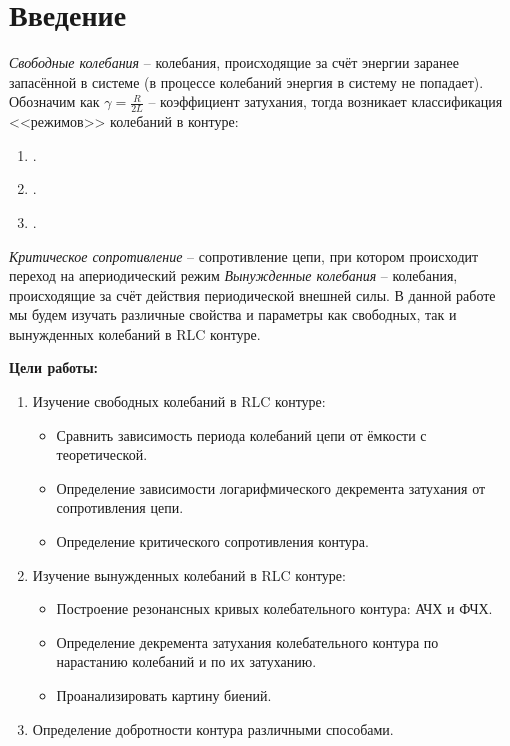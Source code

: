 \documentclass[a4paper,12pt]{extarticle}
\begin{document}
\setcounter{page}{2} %
\let \savenumberline \numberline
\def \numberline#1{\savenumberline{#1.}}
\tableofcontents
\bigskip

\newpage
\section{Введение}
\textit{Свободные колебания} -- колебания, происходящие за счёт энергии заранее запасённой в системе (в процессе колебаний энергия в систему не попадает). Обозначим как $\gamma = \frac{R}{2L}$ -- коэффициент затухания, тогда возникает классификация <<режимов>> колебаний в контуре:
\begin{enumerate}
    \item {}.
    \item {} .
    \item {}.
\end{enumerate}

\textit{Критическое сопротивление} -- сопротивление цепи, при котором происходит переход на апериодический режим
\textit{Вынужденные колебания} -- колебания, происходящие за счёт действия периодической внешней силы.
В данной работе мы будем изучать различные свойства и параметры как свободных, так и вынужденных колебаний в RLC контуре.


\textbf{Цели работы:}
\begin{enumerate}
    \item Изучение свободных колебаний в RLC контуре:
    \begin{itemize}
        \item Сравнить зависимость периода колебаний цепи от ёмкости с теоретической.
        \item Определение зависимости логарифмического декремента затухания от сопротивления цепи.
        \item Определение критического сопротивления контура.
    \end{itemize}
    \item Изучение вынужденных колебаний в RLC контуре:
    \begin{itemize}
        \item Построение резонансных кривых колебательного контура: АЧХ и ФЧХ.
        \item Определение декремента затухания колебательного контура по нарастанию колебаний и по их затуханию.
        \item Проанализировать картину биений.
    \end{itemize}
    \item Определение добротности контура различными способами.
\end{enumerate}
\end{document}
